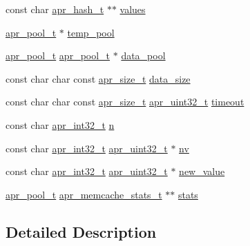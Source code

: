 \begin{DoxyCompactItemize}
\item 
const char \hyperlink{structapr__hash__t}{apr\+\_\+hash\+\_\+t} $\ast$$\ast$ \hyperlink{group__APR__Util__MC_ga5aee14eb2e1149ea060d4fdccb50997d}{values}
\item 
\hyperlink{structapr__pool__t}{apr\+\_\+pool\+\_\+t} $\ast$ \hyperlink{group__APR__Util__MC_gabc902b08134dbf7de7c4ea169a265f56}{temp\+\_\+pool}
\item 
\hyperlink{structapr__pool__t}{apr\+\_\+pool\+\_\+t} \hyperlink{structapr__pool__t}{apr\+\_\+pool\+\_\+t} $\ast$ \hyperlink{group__APR__Util__MC_ga225953f0223e74926c10078f71a9510e}{data\+\_\+pool}
\item 
const char char const \hyperlink{group__apr__platform_gaaa72b2253f6f3032cefea5712a27540e}{apr\+\_\+size\+\_\+t} \hyperlink{group__APR__Util__MC_ga6346d4acf7ce0561990228c94d64f893}{data\+\_\+size}
\item 
const char char const \hyperlink{group__apr__platform_gaaa72b2253f6f3032cefea5712a27540e}{apr\+\_\+size\+\_\+t} \hyperlink{group__apr__platform_ga558548a135d8a816c4787250744ea147}{apr\+\_\+uint32\+\_\+t} \hyperlink{group__APR__Util__MC_ga48b7aa88e5841c0fe69f7d9a88646af3}{timeout}
\item 
const char \hyperlink{group__apr__platform_ga21ef1e35fd3ff9be386f3cb20164ff02}{apr\+\_\+int32\+\_\+t} \hyperlink{group__APR__Util__MC_gad484edfd58b9127caa8f0f59b4004d09}{n}
\item 
const char \hyperlink{group__apr__platform_ga21ef1e35fd3ff9be386f3cb20164ff02}{apr\+\_\+int32\+\_\+t} \hyperlink{group__apr__platform_ga558548a135d8a816c4787250744ea147}{apr\+\_\+uint32\+\_\+t} $\ast$ \hyperlink{group__APR__Util__MC_ga2b55e8053ed93174cfd98d533a3363e8}{nv}
\item 
const char \hyperlink{group__apr__platform_ga21ef1e35fd3ff9be386f3cb20164ff02}{apr\+\_\+int32\+\_\+t} \hyperlink{group__apr__platform_ga558548a135d8a816c4787250744ea147}{apr\+\_\+uint32\+\_\+t} $\ast$ \hyperlink{group__APR__Util__MC_ga3796a7b8c4ac9d2f980262f8b2242ce0}{new\+\_\+value}
\item 
\hyperlink{structapr__pool__t}{apr\+\_\+pool\+\_\+t} \hyperlink{structapr__memcache__stats__t}{apr\+\_\+memcache\+\_\+stats\+\_\+t} $\ast$$\ast$ \hyperlink{group__APR__Util__MC_gaff19ebd812fbce997074d41b1073c76e}{stats}
\end{DoxyCompactItemize}


\subsection{Detailed Description}


